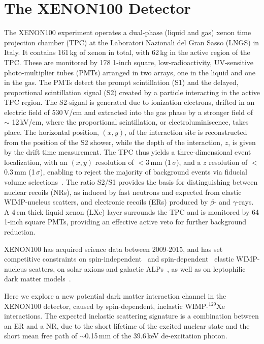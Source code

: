 \section{The XENON100 Detector}
\label{sec:xenon100}

The XENON100 experiment operates a dual-phase (liquid and gas) xenon time projection chamber (TPC) at the Laboratori Nazionali 
del Gran Sasso (LNGS) in Italy. It contains 161\,kg of xenon in total,  with  62\,kg in the active region of the TPC. These 
are monitored by 178 1-inch square, low-radioactivity, UV-sensitive photo-multiplier tubes (PMTs) arranged in two arrays, one in the liquid 
and one in the gas. The PMTs detect the prompt scintillation (S1) and the delayed, proportional scintillation signal (S2) 
created by a particle interacting in the active TPC region. The S2-signal is generated due to ionization electrons, drifted 
in an electric field of 530\,V/cm and extracted into the gas phase by a stronger field of $\sim$ 12\,kV/cm, where the proportional scintillation, or electroluminiscence, 
takes place.
The horizontal position, $(x,y)$, of the interaction site is reconstructed from the position of the S2 shower, while the depth of the interaction, $z$, is given by the drift time measurement.
The TPC thus yields a three-dimensional event localization, with an $(x,y)$ resolution of $<$3\,mm (1\,$\sigma$), and a $z$ resolution of  $<$0.3\,mm (1\,$\sigma$), enabling to reject the majority of background events via fiducial volume selections~\cite{Aprile:2011dd}. The ratio S2/S1 provides the basis for distinguishing between nuclear recoils (NRs), as induced by fast neutrons and expected from elastic WIMP-nucleus scatters, and electronic recoils (ERs) produced by $\beta$- and $\gamma$-rays.  A 4\,cm thick liquid xenon (LXe) layer surrounds the TPC and is monitored by 64 1-inch square PMTs, providing an effective active veto for further background reduction.

XENON100 has acquired science data between 2009-2015, and has set competitive constraints on spin-independent~\cite{Aprile:2012nq,Aprile:2016swn} 
and spin-dependent~\cite{Aprile:2013doa,Aprile:2016swn} elastic WIMP-nucleus 
scatters, on solar axions and galactic ALPs~\cite{Aprile:2014eoa}, as well as on leptophilic dark matter models~\cite{Aprile:2015ade,Aprile:2015ibr,Aprile:2017yea}. 

Here we explore a new potential dark matter interaction channel in the XENON100 detector, caused by spin-dependent, inelastic WIMP-$^{129}$Xe interactions. The expected inelastic scattering signature is a combination between an ER and a NR, due to the short lifetime of the excited nuclear state and  the short mean free path of $\sim$0.15\,mm of the 39.6\,keV de-excitation photon. 


